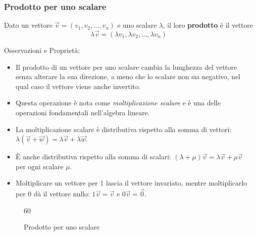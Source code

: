 \documentclass{book}
\begin{document}
\subsubsection{Prodotto per uno scalare}
\begin{theorem}
    Dato un vettore \(\vec{v}=(v_1, v_2, \ldots, v_n)\) e uno scalare \(\lambda\), il loro \textbf{prodotto} è il vettore
    \[
        \lambda\vec{v}=(\lambda v_1, \lambda v_2, \ldots, \lambda v_n)
    \]

    \noindent Osservazioni e Proprietà:
    \begin{itemize}
        \item Il prodotto di un vettore per uno scalare cambia la lunghezza del vettore senza alterare la sua direzione, a meno che lo scalare non sia negativo, nel qual caso il vettore viene anche invertito.
        \item Questa operazione è nota come \textit{moltiplicazione scalare} e è una delle operazioni fondamentali nell'algebra lineare.
        \item La moltiplicazione scalare è distributiva rispetto alla somma di vettori: \(\lambda(\vec{v} + \vec{w}) = \lambda\vec{v} + \lambda\vec{w}\).
        \item È anche distributiva rispetto alla somma di scalari: \((\lambda + \mu)\vec{v} = \lambda\vec{v} + \mu\vec{v}\) per ogni scalare \(\mu\).
        \item Moltiplicare un vettore per 1 lascia il vettore invariato, mentre moltiplicarlo per 0 dà il vettore nullo: \(1\vec{v} = \vec{v}\) e \(0\vec{v} = \vec{0}\).
    \end{itemize}
\end{theorem}
\begin{figure}[H]
    \centering
    \begin{animateinline}{60}
    \end{animateinline}
    \caption{Prodotto per uno scalare}
    \label{fig:scalare}
\end{figure}
\end{document}
